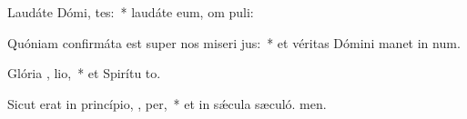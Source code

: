 \item Laudáte Dómi,  tes:~* laudáte eum, om puli:
\item Quóniam confirmáta est super nos miseri jus:~* et véritas Dómini manet in num.
\item Glória ,  lio,~* et Spirítu to.
\item Sicut erat in princípio,  ,  per,~* et in sǽcula sæculó. men.

